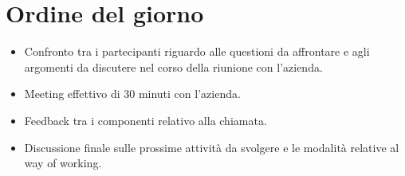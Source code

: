\section{Ordine del giorno}
\begin{itemize}
    \item Confronto tra i partecipanti riguardo alle questioni da affrontare e agli argomenti da discutere nel corso della riunione con l'azienda.
    \item Meeting effettivo di 30 minuti con l'azienda.
    \item Feedback tra i componenti relativo alla chiamata.
    \item Discussione finale sulle prossime attività da svolgere e le modalità relative al way of working.
\end{itemize}
